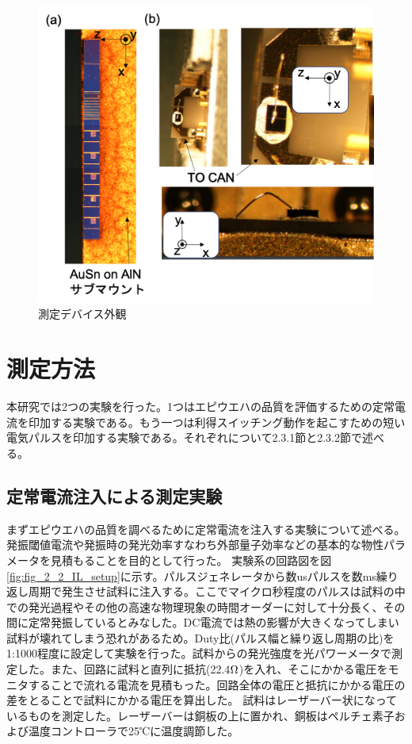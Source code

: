 \begin{figure}[h]%
	\centering
	\includegraphics[width=15cm]{figure/fig_2_1_mount.png}
	\caption{測定デバイス外観}
	\label{fig:fig_2_1_mount}
\end{figure}

\clearpage
\section{測定方法}%
本研究では2つの実験を行った。1つはエピウエハの品質を評価するための定常電流を印加する実験である。もう一つは利得スイッチング動作を起こすための短い電気パルスを印加する実験である。それぞれについて2.3.1節と2.3.2節で述べる。
\subsection{定常電流注入による測定実験}%
まずエピウエハの品質を調べるために定常電流を注入する実験について述べる。発振閾値電流や発振時の発光効率すなわち外部量子効率などの基本的な物性パラメータを見積もることを目的として行った。
実験系の回路図を図\ref{fig:fig_2_2_IL_setup}に示す。パルスジェネレータから数usパルスを数ms繰り返し周期で発生させ試料に注入する。ここでマイクロ秒程度のパルスは試料の中での発光過程やその他の高速な物理現象の時間オーダーに対して十分長く、その間に定常発振しているとみなした。DC電流では熱の影響が大きくなってしまい試料が壊れてしまう恐れがあるため。Duty比(パルス幅と繰り返し周期の比)を1:1000程度に設定して実験を行った。試料からの発光強度を光パワーメータで測定した。また、回路に試料と直列に抵抗(22.4$\rm{\Omega}$)を入れ、そこにかかる電圧をモニタすることで流れる電流を見積もった。回路全体の電圧と抵抗にかかる電圧の差をとることで試料にかかる電圧を算出した。
試料はレーザーバー状になっているものを測定した。レーザーバーは銅板の上に置かれ、銅板はペルチェ素子および温度コントローラで25℃に温度調節した。

